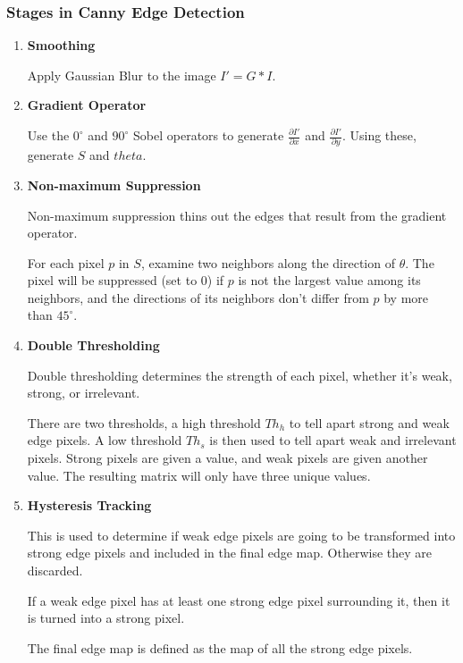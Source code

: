 \documentclass{article}
\begin{document}
\begin{multicols}{2}
\subsubsection{Stages in Canny Edge Detection}

\begin{enumerate}
\item \textbf{Smoothing}

Apply Gaussian Blur to the image $I' = G*I$.

\item \textbf{Gradient Operator}

Use the $0^{\circ}$ and $90^{\circ}$ Sobel operators to generate $\frac{\partial I'}{\partial x}$ and $\frac{\partial I'}{\partial y}$. Using these, generate $S$ and $theta$.

\item \textbf{Non-maximum Suppression}

Non-maximum suppression thins out the edges that result from the gradient operator.

For each pixel $p$ in $S$, examine two neighbors along the direction of $\theta$. The pixel will be suppressed (set to 0) if $p$ is not the largest value among its neighbors, and the directions of its neighbors don't differ from $p$ by more than $45^{\circ}$.

\item \textbf{Double Thresholding}

Double thresholding determines the strength of each pixel, whether it's weak, strong, or irrelevant.

There are two thresholds, a high threshold $Th_h$ to tell apart strong and weak edge pixels. A low threshold $Th_s$ is then used to tell apart weak and irrelevant pixels. Strong pixels are given a value, and weak pixels are given another value. The resulting matrix will only have three unique values.

\item \textbf{Hysteresis Tracking}

This is used to determine if weak edge pixels are going to be transformed into strong edge pixels and included in the final edge map. Otherwise they are discarded.

If a weak edge pixel has at least one strong edge pixel surrounding it, then it is turned into a strong pixel.

The final edge map is defined as the map of all the strong edge pixels.

\end{enumerate}


\end{multicols}
\end{document}
